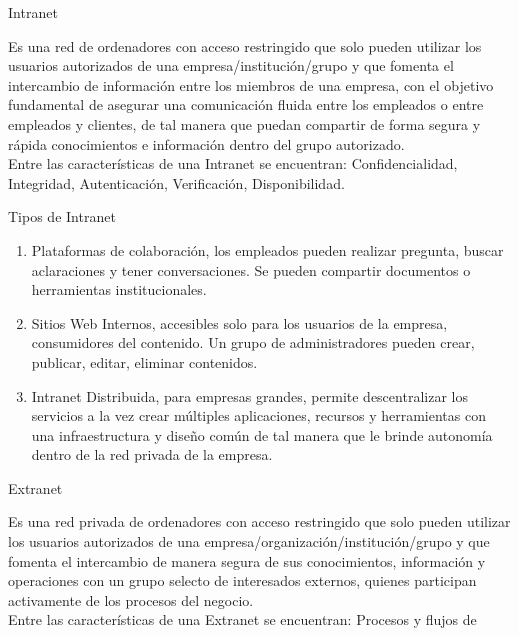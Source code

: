 \documentclass[a4paper,11pt]{article}
\begin{document}
\begin{bf}
Intranet\\ 
\end{bf}
Es una red de ordenadores con acceso restringido que solo pueden utilizar los 
usuarios autorizados de una empresa/institución/grupo y que fomenta el intercambio
de información entre los miembros de una empresa, con el objetivo fundamental de 
asegurar una comunicación fluida entre los empleados o entre empleados y clientes, 
de tal manera que puedan compartir de forma segura y rápida conocimientos e 
información dentro del grupo autorizado.\\
Entre las características de una Intranet se encuentran: Confidencialidad, 
Integridad, Autenticación, Verificación, Disponibilidad.\\ 
\begin{bf}
Tipos de Intranet\\
\end{bf}
\begin{enumerate} 
\item Plataformas de colaboración, los empleados pueden realizar pregunta, buscar 
aclaraciones y tener conversaciones. Se pueden compartir documentos o herramientas 
institucionales.\\
\item Sitios Web Internos, accesibles solo para los usuarios de la empresa, consumidores
del contenido. Un grupo de administradores pueden crear, publicar, editar, 
eliminar contenidos.\\ 
\item Intranet Distribuida, para empresas grandes, permite descentralizar los servicios 
a la vez crear múltiples aplicaciones, recursos y herramientas con una 
infraestructura y diseño común de tal manera que le brinde autonomía dentro de la 
red privada de la empresa.\\
\end{enumerate} 
\begin{bf}
Extranet\\
\end{bf}
Es una red privada de ordenadores con acceso restringido que solo pueden utilizar 
los usuarios autorizados de una empresa/organización/institución/grupo y que 
fomenta el intercambio de manera segura de sus conocimientos, información y 
operaciones con un grupo selecto de interesados externos, quienes participan 
activamente de los procesos del negocio.\\ 
Entre las características de una Extranet se encuentran: Procesos y flujos de 
\end{document}
